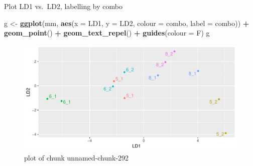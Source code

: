 \documentclass[ignorenonframetext,]{beamer}
\newenvironment{Shaded}{\begin{snugshade}}{\end{snugshade}}
\newcommand{\DataTypeTok}[1]{\textcolor[rgb]{0.13,0.29,0.53}{#1}}
\newcommand{\KeywordTok}[1]{\textcolor[rgb]{0.13,0.29,0.53}{\textbf{#1}}}
\newcommand{\NormalTok}[1]{#1}
\newcommand{\OperatorTok}[1]{\textcolor[rgb]{0.81,0.36,0.00}{\textbf{#1}}}
\newcommand{\StringTok}[1]{\textcolor[rgb]{0.31,0.60,0.02}{#1}}
\begin{document}
\begin{frame}[fragile]{Plot LD1 vs.~LD2, labelling by combo}
\protect\hypertarget{plot-ld1-vs.ld2-labelling-by-combo}{}

\begin{Shaded}
\begin{Highlighting}[]
\NormalTok{g <-}\StringTok{ }\KeywordTok{ggplot}\NormalTok{(mm, }\KeywordTok{aes}\NormalTok{(}\DataTypeTok{x =}\NormalTok{ LD1, }\DataTypeTok{y =}\NormalTok{ LD2, }\DataTypeTok{colour =}\NormalTok{ combo, }
                    \DataTypeTok{label =}\NormalTok{ combo)) }\OperatorTok{+}\StringTok{ }\KeywordTok{geom_point}\NormalTok{() }\OperatorTok{+}
\StringTok{  }\KeywordTok{geom_text_repel}\NormalTok{() }\OperatorTok{+}\StringTok{ }\KeywordTok{guides}\NormalTok{(}\DataTypeTok{colour =}\NormalTok{ F)}
\NormalTok{g}
\end{Highlighting}
\end{Shaded}

\begin{figure}
\centering
\includegraphics{figure/unnamed-chunk-292-1.pdf}
\caption{plot of chunk unnamed-chunk-292}
\end{figure}

\end{frame}
\end{document}
